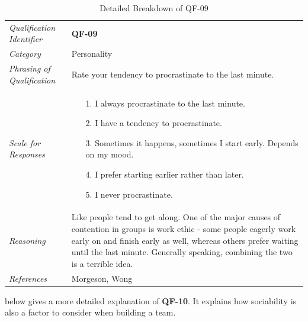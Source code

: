 \documentclass[12pt,letterpaper]{article}
\begin{document}
\begin{table}[H]
	\caption{Detailed Breakdown of QF-09}
	\begin{tabu} to 
		\toprule
		Qualification Identifier & {\bf QF-09}\\
		Category & Personality \\
		Phrasing of Qualification & Rate your tendency to procrastinate to the last minute. \\
		Scale for Responses &
		\begin{minipage}[t]{\linewidth}
			\begin{enumerate}
				\item[1.] I always procrastinate to the last minute.
				\item[2.] I have a tendency to procrastinate.
				\item[3.] Sometimes it happens, sometimes I start early. Depends on my mood.
				\item[4.] I prefer starting earlier rather than later.
				\item[5.] I never procrastinate.
			\end{enumerate}
		\end{minipage}\\
		Reasoning & Like people tend to get along. One of the major causes of contention in groups is work ethic - some people eagerly work early on and finish early as well, whereas  others prefer waiting until the last minute. Generally speaking, combining the two is a terrible idea.\\
		References & Morgeson\cite{morgeson}, Wong\cite{wong}\\
		\toprule
	\end{tabu}
\end{table}

 below gives a more detailed explanation of {\bf QF-10}. It explains how sociability is also a factor to consider when building a team.
\end{document}
